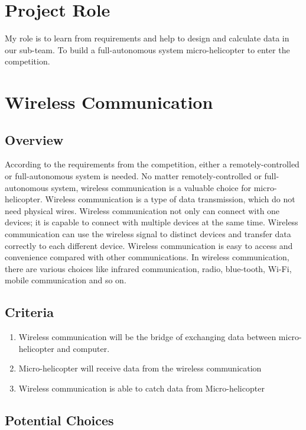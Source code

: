 \documentclass[onecolumn, draftclsnofoot,10pt, compsoc]{IEEEtran}
\begin{document}
\section{Project Role}

My role is to learn from requirements and help to design and calculate data in our sub-team.
To build a full-autonomous system micro-helicopter to enter the competition.

\section{Wireless Communication}

\subsection{Overview}

According to the requirements from the competition, either a remotely-controlled or full-autonomous system is needed.
No matter remotely-controlled or full-autonomous system,
wireless communication is a valuable choice for micro-helicopter.
Wireless communication is a type of data transmission, which do not need physical wires.
Wireless communication not only can connect with one devices;
it is capable to connect with multiple devices at the same time.
Wireless communication can use the wireless signal to distinct devices
and transfer data correctly to each different device.
Wireless communication is easy to access and convenience compared with other communications.
In wireless communication, there are various choices like
infrared communication, radio, blue-tooth, Wi-Fi, mobile communication and so on.

\subsection{Criteria}
\begin{enumerate}
\item{Wireless communication will be the bridge of exchanging data between micro-helicopter and computer.}
\item{Micro-helicopter will receive data from the wireless communication}
\item{Wireless communication is able to catch data from Micro-helicopter}
\end{enumerate}

\subsection{Potential Choices}
\end{document}
